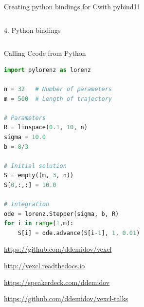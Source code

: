 \documentclass[@BEAMER_OPTIONS@]{beamer}
\newcommand{\CXX}{{\rm C}\plusplus}
\newcommand{\www}[1]{\href{#1}{#1}}
\begin{document}
\begin{frame}[fragile]{Creating python bindings for \CXX with pybind11}
\begin{columns}
\begin{column}[c]{0.6\textwidth}
\begin{onlyenv}
\begin{exampleblock}{4. Python bindings}
\begin{adjustbox}{width=0.6\textwidth, height=\textheight, keepaspectratio}
\begin{minipage}{\textwidth}
                            
                        \end{minipage}
                    \end{adjustbox}
                \end{exampleblock}
            \end{onlyenv}
        \end{column}
    \end{columns}
\end{frame}

\begin{frame}[fragile]{Calling \CXX code from Python}
    \begin{exampleblock}{}
        \begin{lstlisting}[language=python]
import pylorenz as lorenz

n = 32   # Number of parameters
m = 500  # Length of trajectory

# Parameters
R = linspace(0.1, 10, n)
sigma = 10.0
b = 8/3

# Initial solution
S = empty((m, 3, n))
S[0,:,:] = 10.0

# Integration
ode = lorenz.Stepper(sigma, b, R)
for i in range(1,m):
    S[i] = ode.advance(S[i-1], 1, 0.01)
        \end{lstlisting}
    \end{exampleblock}
\end{frame}

\begin{frame}{}
    \begin{description}[Documentation:]
        \item[Source code:] \www{https://github.com/ddemidov/vexcl}
            \vspace{\baselineskip}
        \item[Documentation:] \www{http://vexcl.readthedocs.io}
            \vspace{\baselineskip}
        \item[Slides:] \www{https://speakerdeck.com/ddemidov}
            \vspace{\baselineskip}
        \item[Example codes:] \www{https://github.com/ddemidov/vexcl-talks}
    \end{description}
\end{frame}
\end{document}
